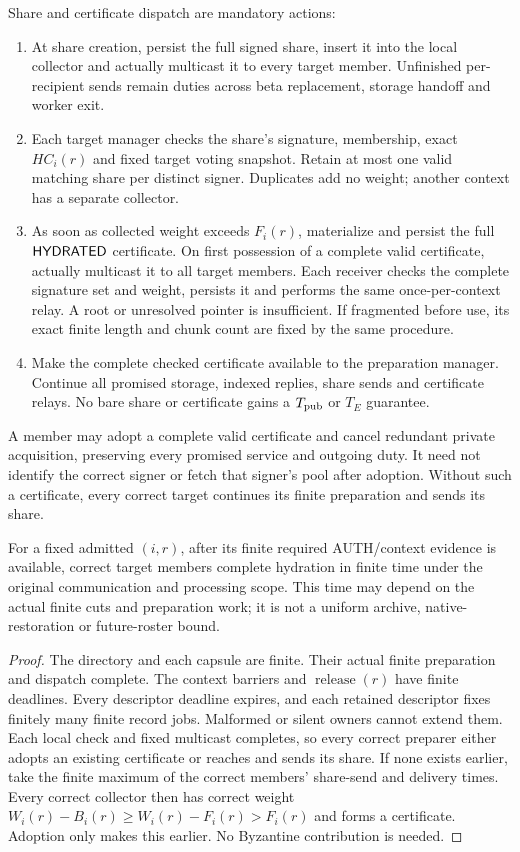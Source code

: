 Share and certificate dispatch are mandatory actions:
\begin{enumerate}[label=(\arabic*),itemsep=3pt]
\item At share creation, persist the full signed share, insert it into
the local collector and actually multicast it to every target member.
Unfinished per-recipient sends remain duties across beta replacement,
storage handoff and worker exit.
\item Each target manager checks the share's signature, membership,
exact $\mathit{HC}_i(r)$ and fixed target voting snapshot. Retain at
most one valid matching share per distinct signer. Duplicates add no
weight; another context has a separate collector.
\item As soon as collected weight exceeds $F_i(r)$, materialize and
persist the full $\mathsf{HYDRATED}$ certificate. On first possession
of a complete valid certificate, actually multicast it to all target
members. Each receiver checks the complete signature set and weight,
persists it and performs the same once-per-context relay. A root or
unresolved pointer is insufficient. If fragmented before use, its
exact finite length and chunk count are fixed by the same procedure.
\item Make the complete checked certificate available to the
preparation manager. Continue all promised storage, indexed replies,
share sends and certificate relays. No bare share or certificate gains
a $T_{\rm pub}$ or $T_E$ guarantee.
\end{enumerate}
A member may adopt a complete valid certificate and cancel redundant
private acquisition, preserving every promised service and outgoing
duty. It need not identify the correct signer or fetch that signer's
pool after adoption. Without such a certificate, every correct target
continues its finite preparation and sends its share.

\begin{proposition}
\label{prop:ownership-formation}
For a fixed admitted $(i,r)$, after its finite required AUTH/context
evidence is available, correct target members complete hydration in
finite time under the original communication and processing scope.
This time may depend on the actual finite cuts and preparation work;
it is not a uniform archive, native-restoration or future-roster bound.
\end{proposition}
\begin{proof}
The directory and each capsule are finite. Their actual finite
preparation and dispatch complete. The context barriers and
$\operatorname{release}(r)$ have finite deadlines. Every descriptor
deadline expires, and each retained descriptor fixes finitely many
finite record jobs. Malformed or silent owners cannot extend them.
Each local check and fixed multicast completes, so every correct
preparer either adopts an existing certificate or reaches and sends
its share. If none exists earlier, take the finite maximum of the
correct members' share-send and delivery times. Every correct collector
then has correct weight
$W_i(r)-B_i(r)\ge W_i(r)-F_i(r)>F_i(r)$ and forms a certificate.
Adoption only makes this earlier. No Byzantine contribution is needed.
\end{proof}

